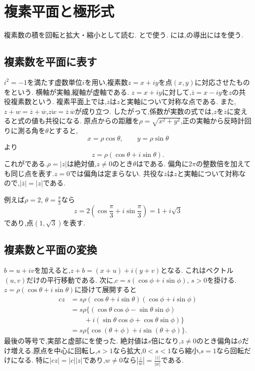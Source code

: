 
\section{複素平面と極形式}\label{節：複素平面と極形式}
複素数の積を回転と拡大・縮小として読む.
とで使う.
には,の導出にはを使う.

\subsection{複素数を平面に表す}\label{節：複素数を平面に表す}
$i^2=-1$を満たす虚数単位$i$を用い,複素数$z=x+iy$を点$(x,y)$に対応させたものをという.
横軸が実軸,縦軸が虚軸である.
$z=x+iy$に対して,$\overline z=x-iy$を$z$の共役複素数という.
複素平面上では,$\overline z$は$z$と実軸について対称な点である.
また,$\overline{z+w}=\overline z+\overline w$,$\overline{zw}=\overline z\,\overline w$が成り立つ.
したがって,係数が実数の式では,$z$を$\overline z$に変えると式の値も共役になる.
原点からの距離を$\rho=\sqrt{x^2+y^2}$,正の実軸から反時計回りに測る角を$\theta$とすると,
\[
  x=\rho\cos\theta,\qquad y=\rho\sin\theta
\]
より
\[
  z=\rho(\cos\theta+i\sin\theta).
\]
これがである.$\rho=|z|$は絶対値,$z\ne0$のとき$\theta$はである.
偏角に$2\pi$の整数倍を加えても同じ点を表す.$z=0$では偏角は定まらない.
共役な$\overline z$は$z$と実軸について対称なので,$|\overline z|=|z|$である.
\BookFigPolar

例えば$\rho=2$, $\theta=\frac{\pi}{3}$なら
\[
  z=2\left(\cos\frac\pi3+i\sin\frac\pi3\right)=1+i\sqrt3
\]
であり,点$(1,\sqrt3)$を表す.

\subsection{複素数と平面の変換}\label{節：複素数と平面の変換}
$b=u+iv$を加えると,$z+b=(x+u)+i(y+v)$となる.
これはベクトル$(u,v)$だけの平行移動である.
次に,$c=s(\cos\phi+i\sin\phi)$, $s>0$を掛ける.
$z=\rho(\cos\theta+i\sin\theta)$に掛けて展開すると
\begin{align*}
  cz&=s\rho(\cos\theta+i\sin\theta)(\cos\phi+i\sin\phi)\\
  &=s\rho\{(\cos\theta\cos\phi-\sin\theta\sin\phi)\\
  &\qquad+i(\sin\theta\cos\phi+\cos\theta\sin\phi)\}\\
  &=s\rho\{\cos(\theta+\phi)+i\sin(\theta+\phi)\}.
\end{align*}
最後の等号で,実部と虚部にを使った.
絶対値は$s$倍になり,$z\ne0$のとき偏角は$\phi$だけ増える.原点を中心に回転し,$s>1$なら拡大,$0<s<1$なら縮小,$s=1$なら回転だけになる.
特に$|cz|=|c||z|$であり,$w\ne0$なら$\left|\frac zw\right|=\frac{|z|}{|w|}$である.
\BookFigComplexRotation

